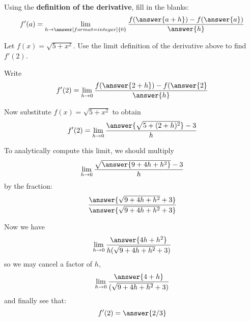 \documentclass{ximera}
\begin{document}
\begin{exercise}

Using the \textbf{definition of the derivative}, fill in the blanks:
  \[
  f'(a)=
  \lim_{h\to\answer[format=integer]{0}}
  \frac{f(\answer{a+h})-f(\answer{a})}{\answer{h}}
  \]


\begin{exercise}
  Let $f(x)=\sqrt{5+x^2}$. Use the limit definition of the derivative
  above to find $f'(2)$.  
  \begin{exercise}
    Write
    \[
    f'(2) = \lim_{h\to 0}\frac{f(\answer{2+h}) -f(\answer{2}}{\answer{h}}
    \]
    \begin{exercise}
      Now substitute $f(x) = \sqrt{5+x^2}$ to obtain
      \[
      f'(2) = \lim_{h\to 0} \frac{\answer{\sqrt{5+(2+h)^2}}-3}{h}
      \]
      \begin{exercise}
        To analytically compute this limit, we should multiply
        \[
        \lim_{h\to 0} \frac{\sqrt{\answer{9+4h+h^2}}-3}{h}
        \]
        by the fraction:
        \[
        \frac{\answer{\sqrt{9+4h+h^2}+3}}{\answer{\sqrt{9+4h+h^2}+3}}
        \]
        \begin{exercise}
          Now we have 
          \[
          \lim_{h\to 0} \frac{\answer{4h+h^2}}{h(\sqrt{9+4h+h^2}+3)}
          \]
          so we may cancel a factor of $h$,
          \[
          \lim_{h\to 0} \frac{\answer{4+h}}{(\sqrt{9+4h+h^2}+3)}
          \]
          and finally see that:
          \[
          f'(2) = \answer{2/3}
          \]
        \end{exercise}
      \end{exercise}
    \end{exercise}
  \end{exercise}
\end{exercise}
\end{exercise}
\end{document}
